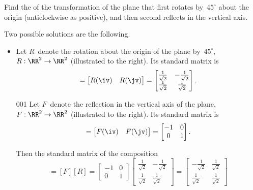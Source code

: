 \begin{example} 
Find the  of the transformation of the plane that first rotates by~\(45^\circ\) about the origin (anticlockwise as positive), and then second reflects in the vertical axis.
\newcommand{\rt}{\frac1{\sqrt2}}
\begin{solution} 
Two possible solutions are the following.
\begin{itemize}
\item 
\begin{figbox}{}%
Let \(R\)~denote the rotation about the origin of the plane by~\(45^\circ\), \(R:\RR^2\to\RR^2\) (illustrated to the right).
Its standard matrix is
\begin{equation*}
[R]=\begin{bmatrix} R(\iv)&R(\jv) \end{bmatrix}
=\begin{bmatrix} \rt&-\rt\\\rt&\rt \end{bmatrix}.
\end{equation*}
\reParshape
\end{figbox}

\begin{figbox}{00{1}}%
Let \(F\)~denote the reflection in the vertical axis of the plane, \(F:\RR^2\to\RR^2\) (illustrated to the right). 
Its standard matrix is
\begin{equation*}
[F]=\begin{bmatrix} F(\iv)&F(\jv) \end{bmatrix}
=\begin{bmatrix} -1&0\\0&1 \end{bmatrix}.
\end{equation*}


Then the standard matrix of the composition 
\begin{equation*}
[F\circ R]=[F][R]
=\begin{bmatrix} -1&0\\0&1 \end{bmatrix}
\begin{bmatrix} \rt&-\rt\\\rt&\rt \end{bmatrix}
=\begin{bmatrix} -\rt&\rt\\\rt&\rt \end{bmatrix}
\end{equation*}
\reParshape
\end{figbox}




\end{itemize}
\end{solution}
\end{example}
